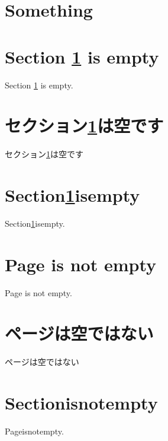 \documentclass[twocolumn]{jarticle}
\begin{document}
\tableofcontents
\section{Something}\label{a}
\section{Section \ref{a} is empty}
Section \ref{a} is empty.
\section{セクション\ref{a}は空です}
セクション\ref{a}は空です
\section{Section\ref{a}isempty}
Section\ref{a}isempty.
\section{Page \pageref{a} is not empty}
Page \pageref{a} is not empty.
\section{ページ\pageref{a}は空ではない}
ページ\pageref{a}は空ではない
\section{Section\pageref{a}isnotempty}
Page\pageref{a}isnotempty.
\end{document}
